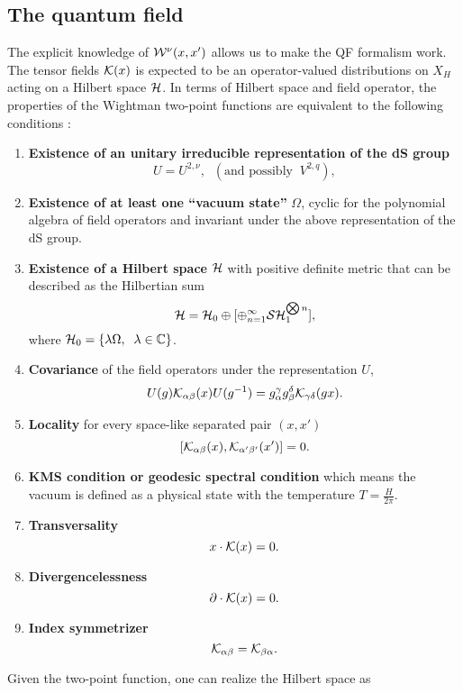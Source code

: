 \documentclass[a4paper,11pt,showpacs,preprintnumbers]{revtex4}
\def\setC{\mathbb{C}}
\begin{document}
\subsection{The quantum field}
 The explicit
knowledge of ${\cal W}^{\nu}(x,x')$ allows us to make the QF
formalism work. The tensor fields ${\bf{\cal K}}(x)$ is expected
to be an operator-valued distributions on $X_H$ acting on a
Hilbert space ${\cal H}$. In terms of Hilbert space and field
operator, the properties of the Wightman two-point functions are
equivalent to the following conditions \cite{stwi}:
\begin{enumerate}
\item {\bf Existence of an unitary irreducible
representation of
the dS group}
 $$ U = U^{2,\nu},\;\; (\mbox{and possibly} \;\; V^{2,q}),$$
\item {\bf Existence of at least one ``vacuum state''}
 $\Omega$,
cyclic for the polynomial algebra of field operators
and invariant
under the above representation of the dS group.
\item {\bf Existence of a Hilbert space} ${\cal H}$
with positive definite metric that can be described as the
Hilbertian sum
$$
{\cal H}={\cal H}_0\oplus[\oplus_{n=1}^{\infty}{\cal S}{\cal
H}_1^{\bigotimes n}],
$$
where ${\cal H}_0=\{ \lambda \Omega,\;\; \lambda \in \setC\}$.
\item {\bf Covariance }
of the field operators under the representation $U$,
$$U(g){ \bf {\cal K}}_{\alpha\beta}(x) U(g^{-1})=
g_{\alpha}^{\gamma} g_{\beta}^{\delta}{\cal K}_{\gamma \delta}(g
x).$$

\item{\bf Locality}
for every space-like separated pair $(x,x')$
$$[{\cal K}_{\alpha\beta}(x),{\cal K}_{\alpha'\beta'}(x')]=0. $$

\item {\bf KMS condition or geodesic spectral
condition} \cite{brmo}
which means the vacuum is defined as a physical state
with the
temperature $T=\frac{H}{2\pi}$.

\item {\bf Transversality}
$$ x\cdot {\cal K}(x)=0.$$

\item {\bf Divergencelessness}
$$ \partial\cdot {\cal K}(x)=0.$$

\item {\bf Index symmetrizer}
$$  {\cal K}_{\alpha \beta}={\cal K}_{\beta \alpha}. $$
\end{enumerate}
Given the two-point function, one can realize the Hilbert space as
\end{document}
